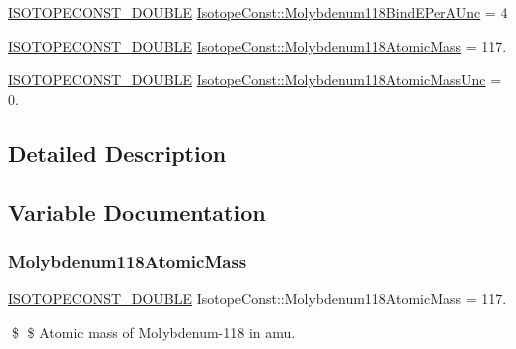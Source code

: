 \begin{DoxyCompactItemize}
\mbox{\hyperlink{group___isotope_const-_macros_ga8f45a7272ce02c0b4c65c44636ed719a}{I\+S\+O\+T\+O\+P\+E\+C\+O\+N\+S\+T\+\_\+\+D\+O\+U\+B\+LE}} \mbox{\hyperlink{group___isotope_const-_molybdenum-_mo118_ga32619b1bbbac227ec41f9db4529f4086}{Isotope\+Const\+::\+Molybdenum118\+Bind\+E\+Per\+A\+Unc}} = 4
\item 
\mbox{\hyperlink{group___isotope_const-_macros_ga8f45a7272ce02c0b4c65c44636ed719a}{I\+S\+O\+T\+O\+P\+E\+C\+O\+N\+S\+T\+\_\+\+D\+O\+U\+B\+LE}} \mbox{\hyperlink{group___isotope_const-_molybdenum-_mo118_ga4a23fccabadda648ea6aac6c22cfcf7c}{Isotope\+Const\+::\+Molybdenum118\+Atomic\+Mass}} = 117.
\item 
\mbox{\hyperlink{group___isotope_const-_macros_ga8f45a7272ce02c0b4c65c44636ed719a}{I\+S\+O\+T\+O\+P\+E\+C\+O\+N\+S\+T\+\_\+\+D\+O\+U\+B\+LE}} \mbox{\hyperlink{group___isotope_const-_molybdenum-_mo118_ga3795ff7ebcff107350673d2b0cd72eff}{Isotope\+Const\+::\+Molybdenum118\+Atomic\+Mass\+Unc}} = 0.
\end{DoxyCompactItemize}


\subsection{Detailed Description}


\subsection{Variable Documentation}
\mbox{\label{group___isotope_const-_molybdenum-_mo118_ga4a23fccabadda648ea6aac6c22cfcf7c}} 
\subsubsection{\texorpdfstring{Molybdenum118\+Atomic\+Mass}{Molybdenum118AtomicMass}}
{\footnotesize\ttfamily \mbox{\hyperlink{group___isotope_const-_macros_ga8f45a7272ce02c0b4c65c44636ed719a}{I\+S\+O\+T\+O\+P\+E\+C\+O\+N\+S\+T\+\_\+\+D\+O\+U\+B\+LE}} Isotope\+Const\+::\+Molybdenum118\+Atomic\+Mass = 117.}

\$ \$ Atomic mass of Molybdenum-\/118 in amu. \mbox{\label{group___isotope_const-_molybdenum-_mo118_ga3795ff7ebcff107350673d2b0cd72eff}} 
